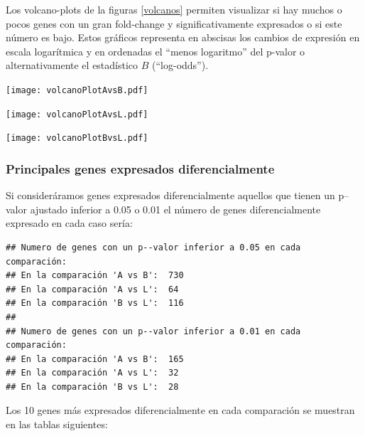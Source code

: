 \documentclass[a4paper]{article}\usepackage[]{graphicx}\usepackage[]{color}
\makeatletter
\newenvironment{kframe}{%
 \def\at@end@of@kframe{}%
 \ifinner\ifhmode%
  \def\at@end@of@kframe{\end{minipage}}%
  \begin{minipage}{\columnwidth}%
 \fi\fi%
 \def\FrameCommand##1{\hskip\@totalleftmargin \hskip-\fboxsep
 \colorbox{shadecolor}{##1}\hskip-\fboxsep
     \hskip-\linewidth \hskip-\@totalleftmargin \hskip\columnwidth}%
 \MakeFramed {\advance\hsize-\width
   \@totalleftmargin\z@ \linewidth\hsize
   \@setminipage}}%
 {\par\unskip\endMakeFramed%
 \at@end@of@kframe}
\newenvironment{knitrout}{}{} %
\makeatother
\begin{document}
Los volcano-plots de la figuras \ref{volcanos} permiten visualizar si hay muchos o pocos genes con un gran fold-change y significativamente expresados o si este número es bajo. Estos gráficos representa en abscisas los cambios de expresión en escala logarítmica
y en ordenadas el ``menos logaritmo'' del p-valor o alternativamente el estadístico $B$ (``log-odds'').


\texttt{[image: volcanoPlotAvsB.pdf]}

\texttt{[image: volcanoPlotAvsL.pdf]}

\texttt{[image: volcanoPlotBvsL.pdf]}



\subsubsection{Principales genes expresados diferencialmente}

Si consideráramos genes expresados diferencialmente aquellos que tienen un p--valor ajustado inferior a 0.05 o 0.01 el número de genes diferencialmente expresado en cada caso sería:

\begin{knitrout}
\color{fgcolor}\begin{kframe}
\begin{verbatim}
## Numero de genes con un p--valor inferior a 0.05 en cada comparación:
## En la comparación 'A vs B':  730
## En la comparación 'A vs L':  64
## En la comparación 'B vs L':  116
## 
## Numero de genes con un p--valor inferior a 0.01 en cada comparación:
## En la comparación 'A vs B':  165
## En la comparación 'A vs L':  32
## En la comparación 'B vs L':  28
\end{verbatim}
\end{kframe}
\end{knitrout}


Los 10 genes más expresados diferencialmente en cada comparación se muestran en las tablas siguientes:

\begin{kframe}


{\ttfamily\noindent\bfseries\color{errorcolor}{\#\# Error in `[.data.frame`(topTab\_AvsB, 1:10, 1:7): undefined columns selected}}

{\ttfamily\noindent\bfseries{}}\end{kframe}
\end{document}
